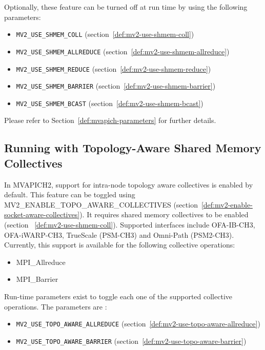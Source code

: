Optionally, these feature can be turned off at run time by using the
following parameters:
\begin{itemize}
	\item{\texttt{MV2\_USE\_SHMEM\_COLL} (section~\ref{def:mv2-use-shmem-coll}})
			
		\item{\texttt{MV2\_USE\_SHMEM\_ALLREDUCE} (section~\ref{def:mv2-use-shmem-allreduce}})

		\item{\texttt{MV2\_USE\_SHMEM\_REDUCE} (section~\ref{def:mv2-use-shmem-reduce}})
		
		\item{\texttt{MV2\_USE\_SHMEM\_BARRIER} (section~\ref{def:mv2-use-shmem-barrier}})
		\item{\texttt{MV2\_USE\_SHMEM\_BCAST} (section~\ref{def:mv2-use-shmem-bcast}})
			\end{itemize}

Please refer to Section~\ref{def:mvapich-parameters} for further details.

\subsection{Running with Topology-Aware Shared Memory Collectives}

In MVAPICH2, support for intra-node topology aware collectives is enabled by default. This feature can be toggled using
MV2\_ENABLE\_TOPO\_AWARE\_COLLECTIVES (section~\ref{def:mv2-enable-socket-aware-collectives}). It requires shared
memory collectives to be enabled (section ~\ref{def:mv2-use-shmem-coll}). Supported interfaces include 
OFA-IB-CH3, OFA-iWARP-CH3, TrueScale (PSM-CH3) and Omni-Path (PSM2-CH3). Currently,
this support is available for the following collective operations:
\begin{itemize}
                \item{MPI\_Allreduce}
                \item{MPI\_Barrier}
\end{itemize}

Run-time parameters exist to toggle each one of the supported collective operations. The parameters are :
\begin{itemize}
\item{\texttt{MV2\_USE\_TOPO\_AWARE\_ALLREDUCE} (section~\ref{def:mv2-use-topo-aware-allreduce}})
\item{\texttt{MV2\_USE\_TOPO\_AWARE\_BARRIER} (section~\ref{def:mv2-use-topo-aware-barrier}})
\end{itemize}

